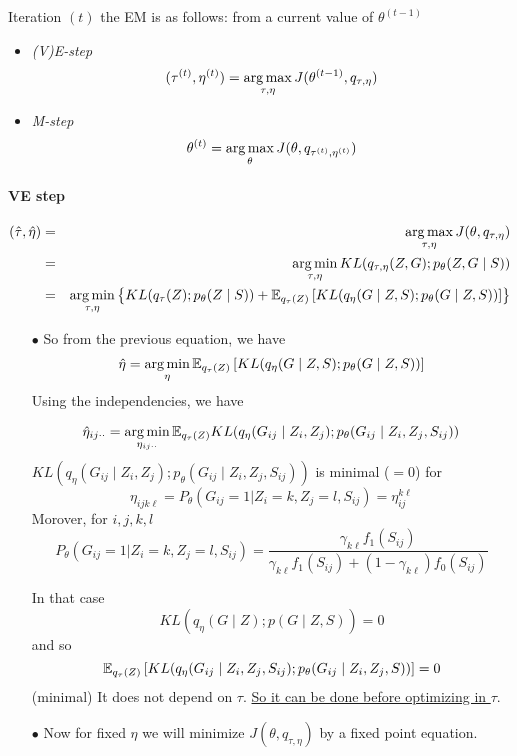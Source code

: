   
  \vspace{2em}
  
Iteration $(t)$ the EM is as follows: from a current value of $\theta^{(t-1)}$

\begin{itemize}
\item \emph{(V)E-step}  $$(\tau^{(t)}, \eta^{(t)}) = \operatorname*{arg\,max}_{\tau,\eta} J(\theta^{(t-1)},q_{\tau,\eta})$$
\item \emph{M-step}  $$ \theta^{(t)} = \operatorname*{arg\,max}_{\theta} J(\theta,q_{\tau^{(t)}, \eta^{(t)}})$$
\end{itemize}




\color{black}

\paragraph{VE step}


\color{red}
\begin{eqnarray*}
(\hat{\tau},\hat{\eta}) &=& \operatorname*{arg\,max}_{\tau,\eta} J(\theta,q_{\tau,\eta}) \\
&=&  \operatorname*{arg\,min}_{\tau,\eta}KL(q_{\tau,\eta}(Z, G) ; p_\theta(Z, G \mid S)) \\
&=&\operatorname*{arg\,min}_{\tau,\eta} \left\{ KL(q_\tau (Z); p_\theta(Z \mid S)) 
+ \mathbb E_{q_\tau(Z)}  \left[KL(q_\eta(G \mid Z, S); p_\theta(G \mid Z, S))\right] \right\}
\end{eqnarray*}

\begin{itemize}
\item[$\bullet$] So from the previous equation, we have
\begin{equation}\label{eq:def_eta}
 \hat{\eta} = \operatorname*{arg\,min}_{\eta} \mathbb E_{q_\tau(Z)}  \left[KL(q_\eta(G \mid Z, S); p_\theta(G \mid Z, S)) \right] 
 \end{equation}
 Using the independencies, we have
 
 \begin{equation}\label{eq:def_etaijkl}
 \hat{\eta}_{ij\cdot \cdot} = \operatorname*{arg\,min}_{\eta_{ij \cdot \cdot}} \mathbb E_{q_\tau(Z)}  KL(q_\eta(G_{ij} \mid Z_{i},Z_j); p_\theta(G_{ij}  \mid Z_i,Z_j, S_{ij})) 
 \end{equation}
 $KL(q_\eta(G_{ij} \mid Z_i,Z_j); p_\theta(G_{ij} \mid Z_i,Z_j, S_{ij})) $ is minimal  ($=0$) for $$ \eta_{ijk\ell} = P_\theta(G_{ij} = 1 | Z_i=k, Z_j=l,S_{ij})  = \eta^{k\ell}_{ij}$$
Morover, for $i,j,k,l$
$$P_\theta(G_{ij} = 1 | Z_i=k , Z_j=l,S_{ij}) =  \frac{\gamma_{k\ell} f_1(S_{ij})}{\gamma_{k\ell} f_1(S_{ij}) + (1 - \gamma_{k\ell}) f_0(S_{ij})}$$

In that case $$KL(q_\eta(G \mid Z); p(G \mid Z, S)) = 0$$ and so $$\mathbb E_{q_\tau(Z)}\left[  KL(q_\eta(G_{ij} \mid Z_{i},Z_j, S_{ij}); p_\theta(G_{ij}  \mid Z_i,Z_j, S))\right] =0$$ (minimal)
It does not depend on $\tau$. 
\underline{So it can be done before optimizing in $\tau$}.
\item[$\bullet$] Now for fixed $\eta$ we will minimize $J(\theta,q_{\tau,\eta})$ by a fixed point equation. 
\end{itemize}

